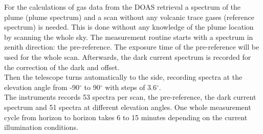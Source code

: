 		For the calculations of gas data from the DOAS retrieval a spectrum of the plume (plume spectrum) and a scan without any volcanic trace gases (reference spectrum) is needed.  This is done without any knowledge of the plume location by scanning the whole sky. 
		The measurement routine starts with a spectrum in zenith direction: the pre-reference. The exposure time of the pre-reference will be used for the whole scan.
		Afterwards, the dark current spectrum is recorded for the correction of the dark and offset.\\
		Then the telescope turns automatically to the side, recording spectra at the elevation angle from -90$^{\circ}$ to 90$^{\circ}$ with steps of 3.6$^{\circ}$. \\
		The instruments records 53 spectra per scan, the pre-reference, the dark current spectrum and 51 spectra at different elevation angles.
		One whole measurement cycle from horizon to horizon takes 6 to 15 minutes depending on the current illumination conditions.
